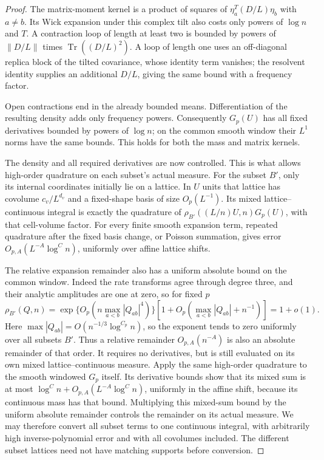 \begin{proof}
The matrix-moment kernel is a product of squares of
\(\eta_a^T(D/L)\eta_b\) with \(a\ne b\).  Its Wick expansion under
this complex tilt also costs only powers of \(\log n\) and \(T\).
A contraction loop of length at least two is bounded by powers of
\(\|D/L\|\) times \(\operatorname{Tr}((D/L)^2)\).  A loop of length
one uses an off-diagonal replica block of the tilted covariance,
whose identity term vanishes; the resolvent identity supplies an
additional \(D/L\), giving the same bound with a frequency factor.

Open contractions end in the already bounded means.  Differentiation
of the resulting density adds only frequency powers. Consequently
\(G_p(U)\) has all
fixed derivatives bounded by powers of \(\log n\); on the common
smooth window their \(L^1\) norms have the same bounds.  This holds
for both the mass and matrix kernels.

The density and all required derivatives are now controlled. This is
what allows high-order quadrature on each subset's actual measure.
For the subset \(B'\), only its internal coordinates initially lie on
a lattice.  In \(U\) units that lattice has covolume
\(c_v/L^{d_v}\) and a fixed-shape basis of size \(O_p(L^{-1})\).
Its mixed lattice--continuous integral is exactly the quadrature of
\(\rho_{B'}((L/n)U,n)G_p(U)\), with that cell-volume factor.
For every finite smooth expansion term, repeated quadrature after
the fixed basis change, or Poisson summation, gives error
\(O_{p,A}(L^{-A}\log^C n)\), uniformly over affine lattice shifts.

The relative expansion remainder also has a uniform absolute bound
on the common window. Indeed the rate transforms agree through
degree three, and their analytic amplitudes are one at zero, so
for fixed \(p\)
\[
 \rho_{B'}(Q,n)
 =\exp\{O_p(n\max_{a<b}|Q_{ab}|^4)\}
       [1+O_p(\max_{a<b}|Q_{ab}|+n^{-1})]=1+o(1).
\]
Here \(\max|Q_{ab}|=O(n^{-1/3}\log^{C_p}n)\), so the
exponent tends to zero uniformly over all subsets \(B'\).
Thus a relative remainder \(O_{p,A}(n^{-A})\) is also an
absolute remainder of that order. It requires no derivatives, but
is still evaluated on its own mixed lattice--continuous measure.
Apply the same high-order quadrature to the smooth windowed
\(G_p\) itself. Its derivative bounds show that its mixed sum is
at most \(\log^C n+O_{p,A}(L^{-A}\log^C n)\), uniformly in the
affine shift, because its continuous mass has that bound.
Multiplying this mixed-sum bound by the uniform absolute remainder
controls the remainder on its actual measure. We may therefore convert all subset terms to one continuous
integral, with arbitrarily high inverse-polynomial error and with
all covolumes included.  The different subset lattices need not have
matching supports before conversion.


\end{proof}
